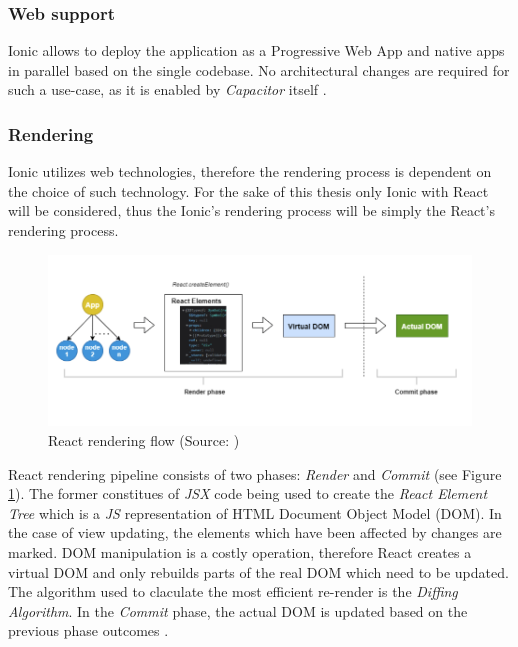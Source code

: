 \subsubsection*{Web support}

Ionic allows to deploy the application as a Progressive Web App and native apps in parallel based on the single codebase. No architectural changes are required for such a use-case, as it is enabled by \emph{Capacitor} itself \cite{ionic_docs_pwa}.

\subsubsection*{Rendering}

Ionic utilizes web technologies, therefore the rendering process is dependent on the choice of such technology. For the sake of this thesis only Ionic with React will be considered, thus the Ionic's rendering process will be simply the React's rendering process.

\begin{figure}[h]
    \centering
    \includegraphics[width=\textwidth]{img/react_render}
    \caption{React rendering flow (Source: \cite{imoh_react_rendering})}
    \label{fig:react_render}
\end{figure}

React rendering pipeline consists of two phases: \emph{Render} and \emph{Commit} (see Figure \ref{fig:react_render}). The former constitues of \emph{JSX} code being used to create the \emph{React Element Tree} which is a \emph{JS} representation of HTML Document Object Model (DOM). In the case of view updating, the elements which have been affected by changes are marked. DOM manipulation is a costly operation, therefore React creates a virtual DOM and only rebuilds parts of the real DOM which need to be updated. The algorithm used to claculate the most efficient re-render is the \emph{Diffing Algorithm}. In the \emph{Commit} phase, the actual DOM is updated based on the previous phase outcomes \cite{imoh_react_rendering}.

